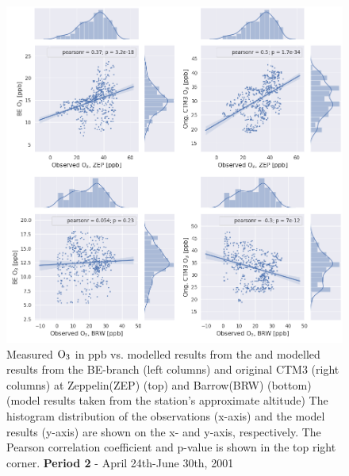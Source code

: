 \begin{figure}[ht]
    \centering
    \includegraphics[width = \linewidth]{Chapter6_Results/images/Orig_BE_comp/jointplot_AprJune_ZEPBRW_O3_2001.png}
    \caption{Measured $\mathrm{O_3}$ in ppb vs. modelled results from the and modelled results from the BE-branch (left columns) and original CTM3 (right columns) at  Zeppelin(ZEP) (top) and Barrow(BRW) (bottom) (model results taken from the station's approximate altitude) The histogram distribution of the observations (x-axis) and the model results (y-axis) are shown on the x- and y-axis, respectively. The Pearson correlation coefficient and p-value is shown in the top right corner. \textbf{Period 2} - April 24th-June 30th, 2001}
    \label{fig:joint_AprMay_ZEPBRW}
\end{figure}